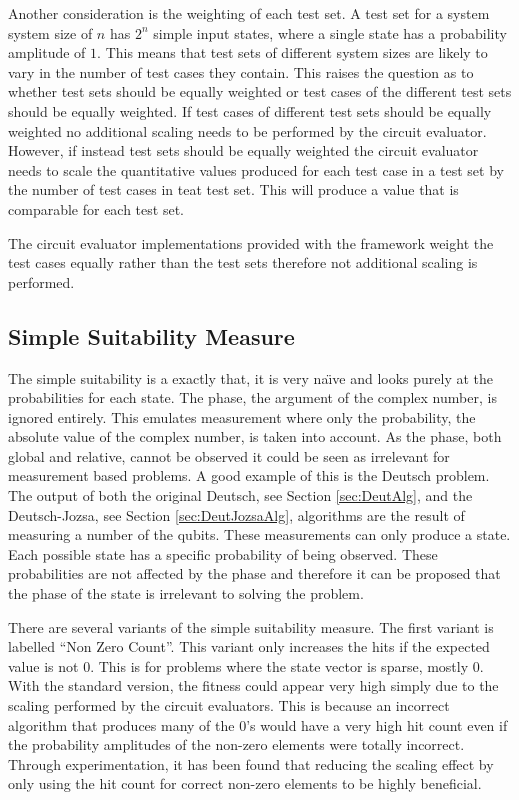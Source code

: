 Another consideration is the weighting of each test set.
A test set for a system system size of $n$ has $2^n$ simple input states, where a single state has a probability amplitude of $1$.
This means that test sets of different system sizes are likely to vary in the number of test cases they contain.
This raises the question as to whether test sets should be equally weighted or test cases of the different test sets should be equally weighted.
If test cases of different test sets should be equally weighted no additional scaling needs to be performed by the circuit evaluator.
However, if instead test sets should be equally weighted the circuit evaluator needs to scale the quantitative values produced for each test case in a test set by the number of test cases in teat test set.
This will produce a value that is comparable for each test set.

The circuit evaluator implementations provided with the framework weight the test cases equally rather than the test sets therefore not additional scaling is performed.

\subsection{Simple Suitability Measure}
\label{sec:simplsuitmeas}
The simple suitability is a exactly that, it is very na\"{\i}ve and looks purely at the probabilities for each state.
The phase, the argument of the complex number, is ignored entirely.
This emulates measurement where only the probability, the absolute value of the complex number, is taken into account.
As the phase, both global and relative, cannot be observed it could be seen as irrelevant for measurement based problems.
A good example of this is the Deutsch problem.
The output of both the original Deutsch, see Section \ref{sec:DeutAlg}, and the Deutsch-Jozsa, see Section \ref{sec:DeutJozsaAlg}, algorithms are the result of measuring a number of the qubits.
These measurements can only produce a state.
Each possible state has a specific probability of being observed.
These probabilities are not affected by the phase and therefore it can be proposed that the phase of the state is irrelevant to solving the problem.

There are several variants of the simple suitability measure.
The first variant is labelled ``Non Zero Count''.
This variant only increases the hits if the expected value is not $0$.
This is for problems where the state vector is sparse, mostly $0$.
With the standard version, the fitness could appear very high simply due to the scaling performed by the circuit evaluators.
This is because an incorrect algorithm that produces many of the $0$'s would have a very high hit count even if the probability amplitudes of the non-zero elements were totally incorrect.
Through experimentation, it has been found that reducing the scaling effect by only using the hit count for correct non-zero elements to be highly beneficial.

